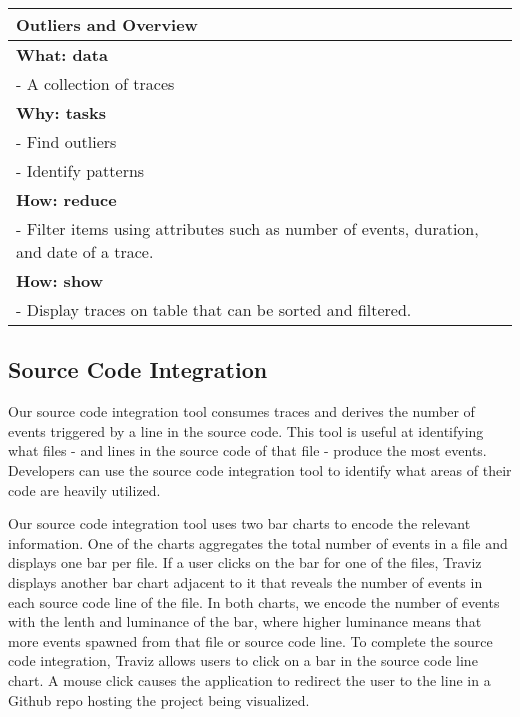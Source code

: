 \begin{center}
    \begin{tabular}{|p{}|}
        \hline
        \textbf{Outliers and Overview}                             \\
        \hline
        \textbf{What: data}                                        \\
        - A collection of traces                                   \\
        \hline
        \textbf{Why: tasks}                                        \\
        - Find outliers                                            \\
        - Identify patterns                                        \\
        \hline
        \textbf{How: reduce}                                       \\
        - Filter items using attributes such as number of events, duration,
        and date of a trace.                                       \\
        \textbf{How: show}                                         \\
        - Display traces on table that can be sorted and filtered. \\
        \hline
    \end{tabular}
\end{center}



\subsection{Source Code Integration}

Our source code integration tool consumes traces and derives the number of events
triggered by a line in the source code. This tool is useful at identifying what files - and lines in the source code of that file -
produce the most events. Developers can use the source code integration tool to identify what areas of their code are heavily utilized.

Our source code integration tool uses two bar charts to encode the relevant information. One of the charts aggregates the total number of events in a
file and displays one bar per file. If a user clicks on the bar for one of the files, Traviz displays another bar chart adjacent to it that
reveals the number of events in each source code line of the file. In both charts, we encode the number of events with the lenth and luminance
of the bar, where higher luminance means that more events spawned from that file or source code line. To complete the
source code integration, Traviz allows users to click on a bar in the source code line chart. A mouse click causes the application to
redirect the user to the line in a Github repo hosting the project being visualized.

